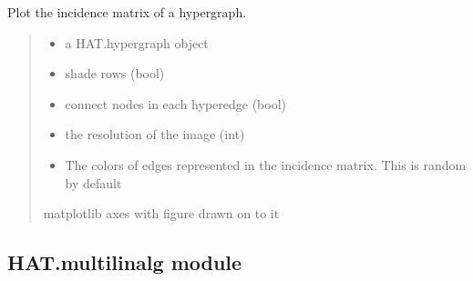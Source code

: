 \documentclass[letterpaper,10pt,english]{sphinxmanual}
\begin{document}
\begin{fulllineitems}
\label{\detokenize{HAT:HAT.draw.incidencePlot}}
\pysigstartsignatures
{}
\pysigstopsignatures
\sphinxAtStartPar
Plot the incidence matrix of a hypergraph.
\begin{quote}\begin{description}
\begin{itemize}
\item {} 
\sphinxAtStartPar
{} \textendash{} a HAT.hypergraph object

\item {} 
\sphinxAtStartPar
{} \textendash{} shade rows (bool)

\item {} 
\sphinxAtStartPar
{} \textendash{} connect nodes in each hyperedge (bool)

\item {} 
\sphinxAtStartPar
{} \textendash{} the resolution of the image (int)

\item {} 
\sphinxAtStartPar
{} \textendash{} The colors of edges represented in the incidence matrix. This is random by default

\end{itemize}

\sphinxAtStartPar
matplotlib axes with figure drawn on to it

\end{description}\end{quote}

\end{fulllineitems}



\subsection{HAT.multilinalg module}
\label{\detokenize{HAT:module-HAT.multilinalg}}\label{\detokenize{HAT:hat-multilinalg-module}}
\end{document}
